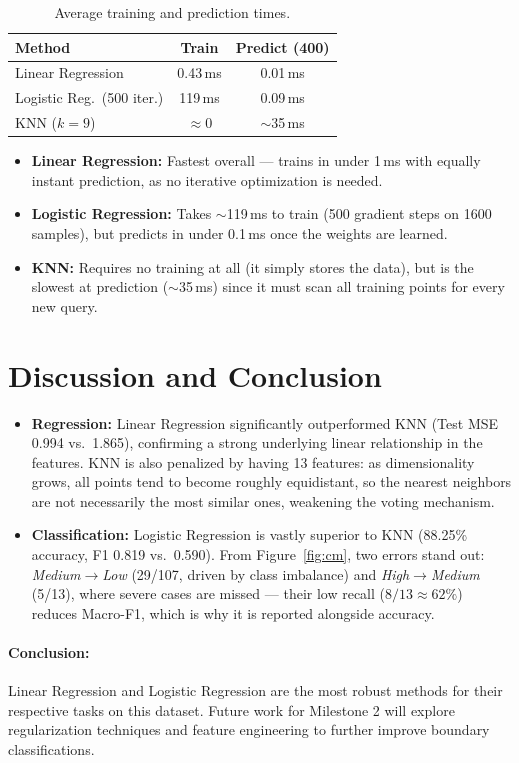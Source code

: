 \documentclass[10pt, twocolumn, letterpaper]{article}
\begin{document}
\begin{table}[H]
\centering
\caption{Average training and prediction times.}
\label{tab:runtime}
\setlength{\tabcolsep}{4pt}
\begin{tabular}{@{}lcc@{}}
\toprule
\textbf{Method} & \textbf{Train} & \textbf{Predict (400)} \\
\midrule
Linear Regression          & 0.43\,ms  & 0.01\,ms \\
Logistic Reg.\ (500 iter.) & 119\,ms   & 0.09\,ms \\
KNN ($k{=}9$)              & $\approx$0 & $\sim$35\,ms \\
\bottomrule
\end{tabular}
\end{table}

\begin{itemize}[noitemsep, leftmargin=*]
    \item \textbf{Linear Regression:} Fastest overall — trains in under 1\,ms with equally instant prediction, as no iterative optimization is needed.
    \item \textbf{Logistic Regression:} Takes $\sim$119\,ms to train (500 gradient steps on 1600 samples), but predicts in under 0.1\,ms once the weights are learned.
    \item \textbf{KNN:} Requires no training at all (it simply stores the data), but is the slowest at prediction ($\sim$35\,ms) since it must scan all training points for every new query.
\end{itemize}

\section{Discussion and Conclusion}
\begin{itemize}[leftmargin=*]
    \item \textbf{Regression:} Linear Regression significantly outperformed KNN (Test MSE 0.994 vs.\ 1.865), confirming a strong underlying linear relationship in the features. KNN is also penalized by having 13 features: as dimensionality grows, all points tend to become roughly equidistant, so the nearest neighbors are not necessarily the most similar ones, weakening the voting mechanism.
    \item \textbf{Classification:} Logistic Regression is vastly superior to KNN (88.25\% accuracy, F1 0.819 vs.\ 0.590). From Figure~\ref{fig:cm}, two errors stand out: \emph{Medium}$\to$\emph{Low} (29/107, driven by class imbalance) and \emph{High}$\to$\emph{Medium} (5/13), where severe cases are missed --- their low recall ($8/13 \approx 62\%$) reduces Macro-F1, which is why it is reported alongside accuracy.
\end{itemize}

\paragraph{Conclusion:} Linear Regression and Logistic Regression are the most robust methods for their respective tasks on this dataset. Future work for Milestone 2 will explore regularization techniques and feature engineering to further improve boundary classifications.
\end{document}
